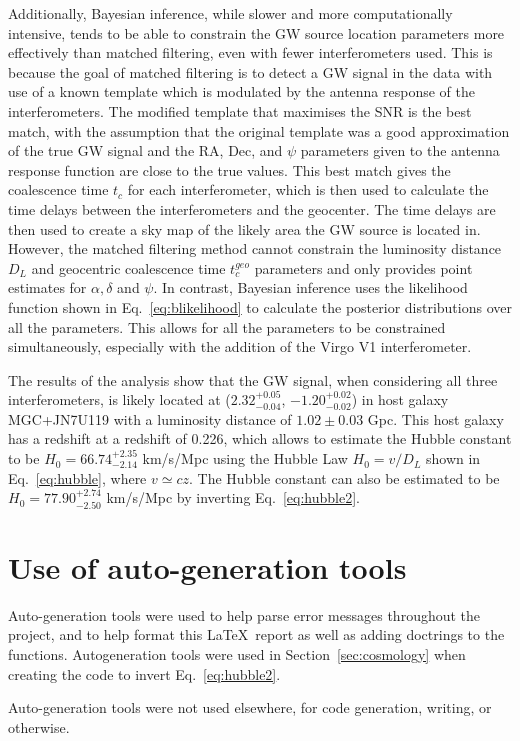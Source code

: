 \documentclass[11pt,a4paper]{article}
\begin{document}
Additionally, Bayesian inference, while slower and more computationally intensive, tends to be able to constrain the GW source location parameters more effectively than matched filtering, even with fewer interferometers used. This is because the goal of matched filtering is to detect a GW signal in the data with use of a known template which is modulated by the antenna response of the interferometers. The modified template that maximises the SNR is the best match, with the assumption that the original template was a good approximation of the true GW signal and the RA, Dec, and $\psi$ parameters given to the antenna response function are close to the true values. This best match gives the coalescence time $t_c$ for each interferometer, which is then used to calculate the time delays between the interferometers and the geocenter. The time delays are then used to create a sky map of the likely area the GW source is located in. However, the matched filtering method cannot constrain the luminosity distance $D_L$ and geocentric coalescence time $t_c^{geo}$ parameters and only provides point estimates for $\alpha, \delta$ and $\psi$. In contrast, Bayesian inference uses the likelihood function shown in Eq.~\ref{eq:blikelihood} to calculate the posterior distributions over all the parameters. This allows for all the parameters to be constrained simultaneously, especially with the addition of the Virgo V1 interferometer.

The results of the analysis show that the GW signal, when considering all three interferometers, is likely located at ($2.32^{+0.05}_{-0.04}$, $-1.20^{+0.02}_{-0.02}$) in host galaxy MGC+JN7U119 with a luminosity distance of $1.02 \pm 0.03$ Gpc. This host galaxy has a redshift at a redshift of 0.226, which allows to estimate the Hubble constant to be $H_0=66.74^{+2.35}_{-2.14}$ km/s/Mpc using the Hubble Law $H_0=v/D_L$ shown in Eq.~\ref{eq:hubble}, where $v\simeq cz$. The Hubble constant can also be estimated to be $H_0=77.90^{+2.74}_{-2.50}$ km/s/Mpc by inverting Eq.~\ref{eq:hubble2}.

\clearpage


\appendix
\section{Use of auto-generation tools}
Auto-generation tools were used to help parse error messages throughout the project, and to help format this \LaTeX\ report as well as adding doctrings to the functions. Autogeneration tools were used in Section~\ref{sec:cosmology} when creating the code to invert Eq.~\ref{eq:hubble2}.

Auto-generation tools were not used elsewhere, for code generation, writing, or otherwise.
\end{document}
